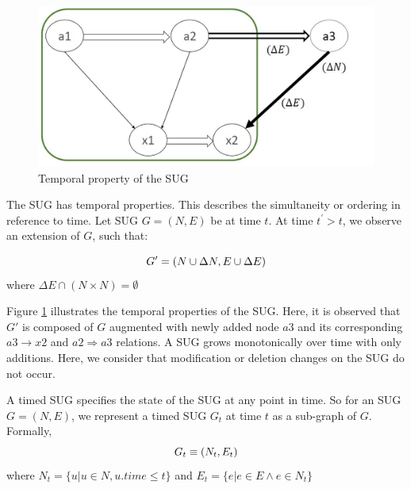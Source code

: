 \begin{figure}
	\centering
	\includegraphics[width=.8\textwidth]{book/chapter-promisesandperils/pics/TemporalSUG.jpg}
	\caption{Temporal property of the SUG}
	\label{fig:SUGTemp}
\end{figure}

\begin{definition}
    
	The SUG has temporal properties.
This describes the simultaneity or ordering in reference to time. Let SUG $G = (N, E) $ be at time $t$. At time $t^{\prime} > t$, we observe an extension of $G$, such that:

\begin{equation}
\small G^{\prime} = (N \cup \Delta N, E \cup \Delta E)
\end{equation}
where $\Delta E \cap (N \times N) = \emptyset$
\end{definition}

Figure \ref{fig:SUGTemp} illustrates the temporal properties of the SUG. 
Here, it is observed that $G'$ is composed of $G$ augmented with newly added node $a3$ and its corresponding $a3 \rightarrow x2$ and $a2 \Rightarrow a3$ relations.
A SUG grows monotonically over time with only additions.
Here, we consider that modification or deletion changes on the SUG do not occur. 

\begin{definition}
    A timed SUG specifies the state of the SUG at any point in time.
So for an SUG $G=(N,E)$, we represent a timed SUG $G_{t}$ at time $t$ as a sub-graph of $G$. Formally,
\begin{equation}
\small G_t\equiv(N_{t}, E_{t})
\end{equation}
where $N_{t} = \{u|u \in N, u.time \leq t \}$ and $E_t = \{ e | e \in E \wedge e \in  N_t \}$
\end{definition}
	


